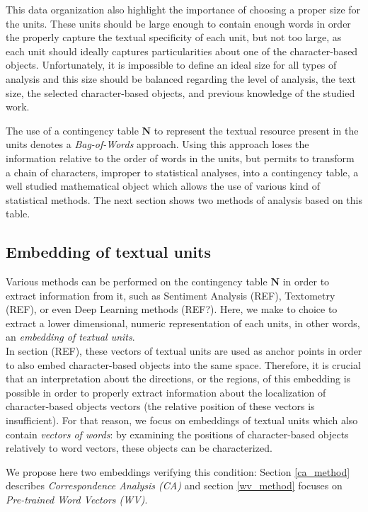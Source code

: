 \documentclass[
twocolumn,
]{ceurart}
\begin{document}
This data organization also highlight the importance of choosing a proper size for the units. These units should be large enough to contain enough words in order the properly capture the textual specificity of each unit, but not too large, as each unit should ideally captures particularities about one of the character-based objects. Unfortunately, it is impossible to define an ideal size for all types of analysis and this size should be balanced regarding the level of analysis, the text size, the selected character-based objects, and previous knowledge of the studied work.

The use of a contingency table $\mathbf{N}$ to represent the textual resource present in the units denotes a \emph{Bag-of-Words} approach. Using this approach loses the information relative to the order of words in the units, but permits to transform a chain of characters, improper to statistical analyses, into a contingency table, a well studied mathematical object which allows the use of various kind of statistical methods. The next section shows two methods of analysis based on this table.

\subsection{Embedding of textual units}
\label{unit_embeddings}

Various methods can be performed on the contingency table $\mathbf{N}$ in order to extract information from it, such as Sentiment Analysis (REF), Textometry (REF), or even Deep Learning methods (REF?). Here, we make to choice to extract a lower dimensional, numeric representation of each units, in other words, an \emph{embedding of textual units}. \\
In section (REF), these vectors of textual units are used as anchor points in order to also embed character-based objects into the same space. Therefore, it is crucial that an interpretation about the directions, or the regions, of this embedding is possible in order to properly extract information about the localization of character-based objects vectors (the relative position of these vectors is insufficient). For that reason, we focus on embeddings of textual units which also contain \emph{vectors of words}: by examining the positions of character-based objects relatively to word vectors, these objects can be characterized.

We propose here two embeddings verifying this condition: Section \ref{ca_method} describes \emph{Correspondence Analysis (CA)} and section \ref{wv_method} focuses on \emph{Pre-trained Word Vectors (WV)}. 
\end{document}
